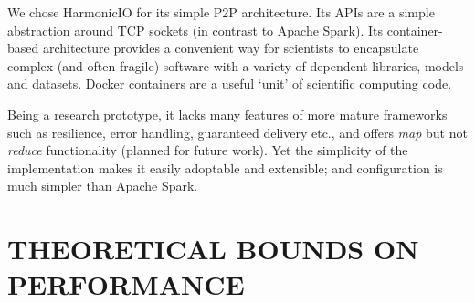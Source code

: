\documentclass[conference]{IEEEtran}
\begin{document}
We chose HarmonicIO for its simple P2P architecture. Its APIs are a simple abstraction around TCP sockets (in contrast to Apache Spark). Its container-based architecture provides a convenient way for scientists to encapsulate complex (and often fragile) software with a variety of dependent libraries, models and datasets. Docker containers are a useful `unit' of scientific computing code.%

Being a research prototype, it lacks many features of more mature frameworks such as resilience, error handling, guaranteed delivery etc., and offers \emph{map} but not   \emph{reduce} functionality (planned for future work). Yet the simplicity of the implementation makes it easily adoptable and extensible; and configuration is much simpler than Apache Spark. 




\section{THEORETICAL BOUNDS ON PERFORMANCE}\label{theobounds}
\end{document}
